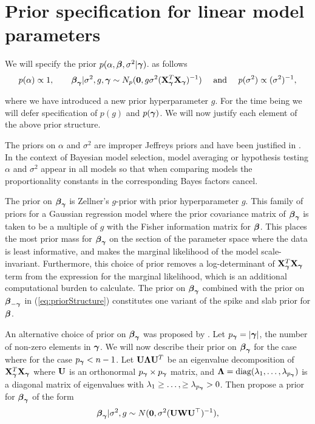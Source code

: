 \section{Prior specification for linear model parameters}
\label{sec:model}

We will specify the prior $p(\alpha,{\boldsymbol \beta},\sigma^2|{\boldsymbol \gamma})$.
as follows
\begin{equation}
	\label{eq:priorStructure}
	\begin{array}{c}
		\displaystyle p(\alpha) \propto 1,  
		\qquad 
		{\boldsymbol\beta}_{\boldsymbol \gamma} | \sigma^2, g, {\boldsymbol \gamma} \sim N_p({\bf 0}, g \sigma^2 ({\bf X}_{\boldsymbol \gamma}^T {\bf X}_{\boldsymbol \gamma})^{-1})
		\quad \text{ and }  \quad 
		\displaystyle p(\sigma^2) \propto (\sigma^2)^{-1},                      
	\end{array}
\end{equation} 

\noindent where we have introduced a new prior hyperparameter $g$.
For the time being we will defer specification of $p(g)$ and $p({\boldsymbol \gamma})$.
We will now justify each element of the above prior structure.

The priors on $\alpha$ and $\sigma^2$ are improper Jeffreys priors and have been justified 
in \cite{Berger1998}. In the context of Bayesian model selection, model averaging or hypothesis 
testing $\alpha$ and $\sigma^2$ appear in all models 
so that when comparing models the proportionality constants in the corresponding
Bayes factors cancel.

The prior on ${\boldsymbol \beta}_{\boldsymbol \gamma}$ is Zellner's $g$-prior \citep[see for example,][]{Zellner1986} with prior 
hyperparameter $g$. This family of priors for a Gaussian regression model where the prior covariance 
matrix of ${\boldsymbol \beta}_{\boldsymbol \gamma}$ is taken to be a multiple of $g$ with the Fisher information matrix for ${\boldsymbol \beta}$. 
This places the most prior mass for ${\boldsymbol \beta}_{\boldsymbol \gamma}$ on the section of the parameter space where the data is 
least informative, and makes the marginal likelihood of the model scale-invariant. Furthermore, this 
choice of prior removes a log-determinant of ${\bf X}_{\boldsymbol \gamma}^T{\bf X}_{\boldsymbol \gamma}$ term from the expression for the marginal 
likelihood, which is an additional computational burden to calculate.
The prior on ${\boldsymbol \beta}_{\boldsymbol \gamma}$ combined with the prior on ${\boldsymbol \beta}_{-{\boldsymbol \gamma}}$
in (\ref{eq:priorStructure}) constitutes one variant of the spike and slab prior for ${\boldsymbol \beta}$.

An alternative choice of prior on ${\boldsymbol \beta}_{\boldsymbol \gamma}$ was proposed by \cite{Maruyama2011}. Let
$p_{{\boldsymbol \gamma}} = |{\boldsymbol \gamma}|$, the number of non-zero elements in ${\boldsymbol \gamma}$. We will now describe their prior on ${\boldsymbol \beta}_{\boldsymbol \gamma}$ for the case where for the case
$p_{{\boldsymbol \gamma}} < n - 1$. Let ${\bf U}{\boldsymbol \Lambda}{\bf U}^T$ be an eigenvalue decomposition of ${\bf X}_{\boldsymbol \gamma}^T{\bf X}_{\boldsymbol \gamma}$
where ${\bf U}$ is an orthonormal $p_{{\boldsymbol \gamma}} \times p_{{\boldsymbol \gamma}}$ matrix, and ${\boldsymbol \Lambda} = \mbox{diag}(\lambda_1,\ldots,\lambda_{p_{{\boldsymbol \gamma}}})$ 
is a diagonal matrix of eigenvalues with $\lambda_1\ge\ldots,\ge \lambda_{p_{{\boldsymbol \gamma}}}>0$. Then \cite{Maruyama2011} 
propose a prior for ${\boldsymbol \beta}_{\boldsymbol \gamma}$ of the form
\begin{equation}
	\label{eq:priorBetaMG}
	{\boldsymbol\beta}_{\boldsymbol \gamma} | \sigma^2, g \sim N({\bf 0}, \sigma^2 ({\bf U}{\bf W}{\bf U}^\top)^{-1}),   
\end{equation} 

